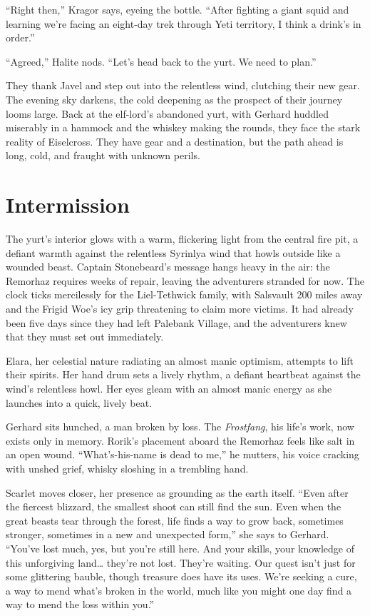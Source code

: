 \documentclass[
  letterpaper,12pt,twoside,twocolumn,openany,
  nodeprecatedcode,bg=full]{dndbook}
\begin{document}
``Right then,'' Kragor says, eyeing the bottle. ``After fighting a giant
squid and learning we're facing an eight-day trek through Yeti
territory, I think a drink's in order.''

``Agreed,'' Halite nods. ``Let's head back to the yurt. We need to
plan.''

They thank Javel and step out into the relentless wind, clutching their
new gear. The evening sky darkens, the cold deepening as the prospect of
their journey looms large. Back at the elf-lord's abandoned yurt, with
Gerhard huddled miserably in a hammock and the whiskey making the
rounds, they face the stark reality of Eiselcross. They have gear and a
destination, but the path ahead is long, cold, and fraught with unknown
perils.

\chapter{Intermission}\label{intermission}

The yurt's interior glows with a warm, flickering light from the central
fire pit, a defiant warmth against the relentless Syrinlya wind that
howls outside like a wounded beast. Captain Stonebeard's message hangs
heavy in the air: the Remorhaz requires weeks of repair, leaving the
adventurers stranded for now. The clock ticks mercilessly for the
Liel-Tethwick family, with Salsvault 200 miles away and the Frigid Woe's
icy grip threatening to claim more victims. It had already been five
days since they had left Palebank Village, and the adventurers knew that
they must set out immediately.

Elara, her celestial nature radiating an almost manic optimism, attempts
to lift their spirits. Her hand drum sets a lively rhythm, a defiant
heartbeat against the wind's relentless howl. Her eyes gleam with an
almost manic energy as she launches into a quick, lively beat.

Gerhard sits hunched, a man broken by loss. The \emph{Frostfang}, his
life's work, now exists only in memory. Rorik's placement aboard the
Remorhaz feels like salt in an open wound. ``What's-his-name is dead to
me,'' he mutters, his voice cracking with unshed grief, whisky sloshing
in a trembling hand.

Scarlet moves closer, her presence as grounding as the earth itself.
``Even after the fiercest blizzard, the smallest shoot can still find
the sun. Even when the great beasts tear through the forest, life finds
a way to grow back, sometimes stronger, sometimes in a new and
unexpected form,'' she says to Gerhard. ``You've lost much, yes, but
you're still here. And your skills, your knowledge of this unforgiving
land\ldots{} they're not lost. They're waiting. Our quest isn't just for
some glittering bauble, though treasure does have its uses. We're
seeking a cure, a way to mend what's broken in the world, much like you
might one day find a way to mend the loss within you.''
\end{document}
